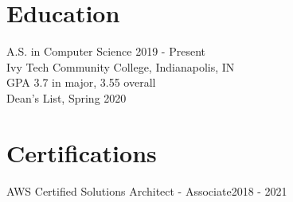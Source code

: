 \documentclass[margin]{res}
\begin{document}
\begin{resume}
\section{Education} 
A.S. in Computer Science \hfill2019 - Present\\
Ivy Tech Community College, Indianapolis, IN\\
GPA 3.7 in major, 3.55 overall\\
Dean's List, Spring 2020

\section{Certifications} 
AWS Certified Solutions Architect - Associate\hfill 2018 - 2021
 


\end{resume} 
\end{document}
